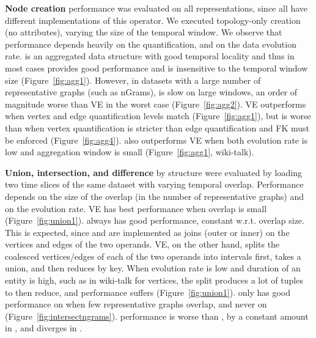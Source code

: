{\bf Node creation} performance was evaluated on all representations,
since all have different implementations of this operator.  We
executed topology-only creation (no attributes), varying the size
of the temporal window.  We observe that performance depends heavily
on the quantification, and on the data evolution rate.  \og is an
aggregated data structure with good temporal locality and thus in most
cases provides good performance and is insensitive to the temporal
window size (Figure~\ref{fig:agg1}).  However, in datasets with a
large number of representative graphs (such as nGrams), \og is slow on
large windows, an order of magnitude worse than VE in the worst case
(Figure~\ref{fig:agg2}).  VE outperforms \og when vertex and edge
quantification levels match (Figure~\ref{fig:agg1}), but is worse than
\og when vertex quantification is stricter than edge quantification
and FK must be enforced (Figure~\ref{fig:agg4}).  \og also outperforms
VE when both evolution rate is low and aggregation window is small
(Figure~\ref{fig:agg1}, wiki-talk).

{\bf Union, intersection, and difference} by structure were evaluated
by loading two time slices of the same dataset with varying temporal
overlap.  Performance depends on the size of the overlap (in the
number of representative graphs) and on the evolution rate.  VE has
best performance when overlap is small (Figure~\ref{fig:union1}).  \og always has good
performance, constant w.r.t. overlap size.  This is expected, since
\og {} and  are implemented as joins
(outer or inner) on the vertices and edges of the two operands.  VE,
on the other hand, splits the coalesced vertices/edges of each of the
two operands into intervals first, takes a union, and then reduces by
key.  When evolution rate is low and duration of an entity is high,
such as in wiki-talk for vertices, the split produces a lot of tuples
to then reduce, and performance suffers (Figure~\ref{fig:union1}). \sg
only has good performance on  when few
representative graphs overlap, and never on 
(Figure~\ref{fig:intersectngrams}). \hg performance is worse than \og,
by a constant amount in , and diverges in
.  

